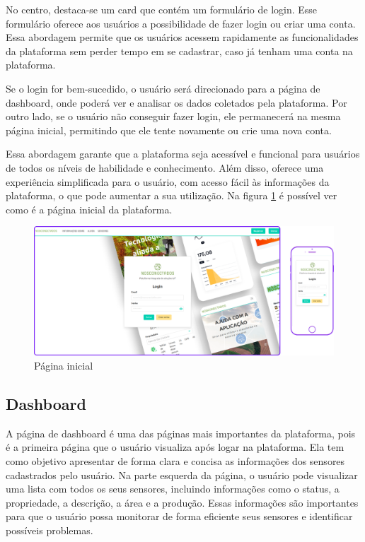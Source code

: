 \documentclass[tcc,capa]{texufpel}
\begin{document}
No centro, destaca-se um card que contém um formulário de login. Esse formulário oferece aos usuários a possibilidade de fazer login ou criar uma conta. Essa abordagem permite que os usuários acessem rapidamente as funcionalidades da plataforma sem perder tempo em se cadastrar, caso já tenham uma conta na plataforma.

Se o login for bem-sucedido, o usuário será direcionado para a página de dashboard, onde poderá ver e analisar os dados coletados pela plataforma. Por outro lado, se o usuário não conseguir fazer login, ele permanecerá na mesma página inicial, permitindo que ele tente novamente ou crie uma nova conta.

Essa abordagem garante que a plataforma seja acessível e funcional para usuários de todos os níveis de habilidade e conhecimento. Além disso, oferece uma experiência simplificada para o usuário, com acesso fácil às informações da plataforma, o que pode aumentar a sua utilização. Na figura \ref{home} é possível ver como é a página inicial da plataforma.
\begin{figure}[htbp]
  \centering \includegraphics[scale=.2]{assets/home.png}
  \caption{Página inicial}
  \label{home}
\end{figure}

\subsection{Dashboard}
A página de dashboard é uma das páginas mais importantes da plataforma, pois é a primeira página que o usuário visualiza após logar na plataforma. Ela tem como objetivo apresentar de forma clara e concisa as informações dos sensores cadastrados pelo usuário. Na parte esquerda da página, o usuário pode visualizar uma lista com todos os seus sensores, incluindo informações como o status, a propriedade, a descrição, a área e a produção. Essas informações são importantes para que o usuário possa monitorar de forma eficiente seus sensores e identificar possíveis problemas.
\end{document}
